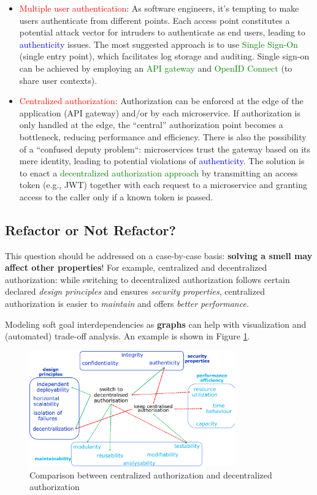 \begin{itemize}
    \item \textcolor{red}{Multiple user authentication}: As software engineers, it's tempting to make users authenticate from different points. Each access point constitutes a potential attack vector for intruders to authenticate as end users, leading to \textcolor{blue}{authenticity} issues. The most suggested approach is to use \textcolor{green}{Single Sign-On} (single entry point), which facilitates log storage and auditing. Single sign-on can be achieved by employing an \textcolor{green}{API gateway} and \textcolor{green}{OpenID Connect} (to share user contexts).
    \item \textcolor{red}{Centralized authorization}: Authorization can be enforced at the edge of the application (API gateway) and/or by each microservice. If authorization is only handled at the edge, the “central” authorization point becomes a bottleneck, reducing performance and efficiency. There is also the possibility of a “confused deputy problem“: microservices trust the gateway based on its mere identity, leading to potential violations of \textcolor{blue}{authenticity}. The solution is to enact a \textcolor{green}{decentralized authorization approach} by transmitting an access token (e.g., JWT) together with each request to a microservice and granting access to the caller only if a known token is passed.
\end{itemize}

\subsection{Refactor or Not Refactor?}

This question should be addressed on a case-by-case basis: \textbf{solving a smell may affect other properties}! For example, centralized and decentralized authorization: while switching to decentralized authorization follows certain declared \textit{design principles} and ensures \textit{security properties}, centralized authorization is easier to \textit{maintain} and offers \textit{better performance}.

Modeling soft goal interdependencies as \textbf{graphs} can help with visualization and (automated) trade-off analysis. An example is shown in Figure \ref{fig:authorization}.

\begin{figure} [H]
    \centering
    \includegraphics[width=0.79\textwidth]{images/Security/authorization.png}
    \caption{Comparison between centralized authorization and decentralized authorization}
    \label{fig:authorization}
\end{figure}
